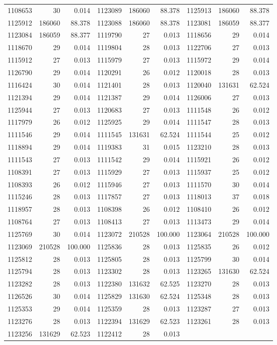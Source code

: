 \documentclass[11pt,a4paper]{article}
\begin{document}
\begin{longtable}{rrr|rrr|rrr}
1108653 & 30 & 0.014 & 1123089 & 186060 & 88.378 & 1125913 & 186060 & 88.378\\
1125912 & 186060 & 88.378 & 1123088 & 186060 & 88.378 & 1123081 & 186059 & 88.377\\
1123084 & 186059 & 88.377 & 1119790 & 27 & 0.013 & 1118656 & 29 & 0.014\\
1118670 & 29 & 0.014 & 1119804 & 28 & 0.013 & 1122706 & 27 & 0.013\\
1115912 & 27 & 0.013 & 1115979 & 27 & 0.013 & 1115972 & 29 & 0.014\\
1126790 & 29 & 0.014 & 1120291 & 26 & 0.012 & 1120018 & 28 & 0.013\\
1116424 & 30 & 0.014 & 1121401 & 28 & 0.013 & 1120040 & 131631 & 62.524\\
1121394 & 29 & 0.014 & 1121387 & 29 & 0.014 & 1126006 & 27 & 0.013\\
1125944 & 27 & 0.013 & 1120683 & 27 & 0.013 & 1111548 & 26 & 0.012\\
1117979 & 26 & 0.012 & 1125925 & 29 & 0.014 & 1111547 & 28 & 0.013\\
1111546 & 29 & 0.014 & 1111545 & 131631 & 62.524 & 1111544 & 25 & 0.012\\
1118894 & 29 & 0.014 & 1119383 & 31 & 0.015 & 1123210 & 28 & 0.013\\
1111543 & 27 & 0.013 & 1111542 & 29 & 0.014 & 1115921 & 26 & 0.012\\
1108391 & 27 & 0.013 & 1115929 & 27 & 0.013 & 1115937 & 25 & 0.012\\
1108393 & 26 & 0.012 & 1115946 & 27 & 0.013 & 1111570 & 30 & 0.014\\
1115246 & 28 & 0.013 & 1117857 & 27 & 0.013 & 1118013 & 37 & 0.018\\
1118957 & 28 & 0.013 & 1108398 & 26 & 0.012 & 1108410 & 26 & 0.012\\
1108764 & 27 & 0.013 & 1108413 & 27 & 0.013 & 1113473 & 29 & 0.014\\
1125769 & 30 & 0.014 & 1123072 & 210528 & 100.000 & 1123064 & 210528 & 100.000\\
1123069 & 210528 & 100.000 & 1125836 & 28 & 0.013 & 1125835 & 26 & 0.012\\
1125812 & 28 & 0.013 & 1125805 & 28 & 0.013 & 1125799 & 30 & 0.014\\
1125794 & 28 & 0.013 & 1123302 & 28 & 0.013 & 1123265 & 131630 & 62.524\\
1123282 & 28 & 0.013 & 1122380 & 131632 & 62.525 & 1123270 & 28 & 0.013\\
1126526 & 30 & 0.014 & 1125829 & 131630 & 62.524 & 1125348 & 28 & 0.013\\
1125353 & 29 & 0.014 & 1125359 & 28 & 0.013 & 1123287 & 27 & 0.013\\
1123276 & 28 & 0.013 & 1122394 & 131629 & 62.523 & 1123261 & 28 & 0.013\\
1123256 & 131629 & 62.523 & 1122412 & 28 & 0.013 &  &  & \\
\bottomrule\end{longtable}\normalsize
\end{document}
